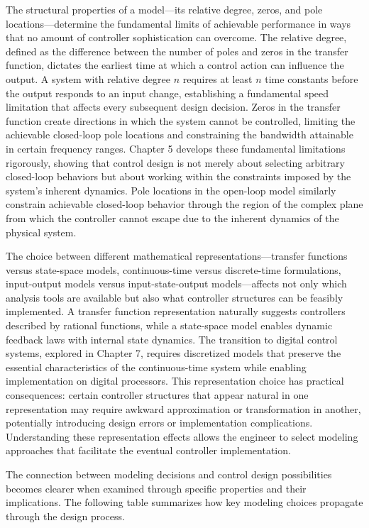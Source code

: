The structural properties of a model—its relative degree, zeros, and pole locations—determine the fundamental limits of achievable performance in ways that no amount of controller sophistication can overcome. The relative degree, defined as the difference between the number of poles and zeros in the transfer function, dictates the earliest time at which a control action can influence the output. A system with relative degree $n$ requires at least $n$ time constants before the output responds to an input change, establishing a fundamental speed limitation that affects every subsequent design decision. Zeros in the transfer function create directions in which the system cannot be controlled, limiting the achievable closed-loop pole locations and constraining the bandwidth attainable in certain frequency ranges. Chapter 5 develops these fundamental limitations rigorously, showing that control design is not merely about selecting arbitrary closed-loop behaviors but about working within the constraints imposed by the system's inherent dynamics. Pole locations in the open-loop model similarly constrain achievable closed-loop behavior through the region of the complex plane from which the controller cannot escape due to the inherent dynamics of the physical system.

The choice between different mathematical representations—transfer functions versus state-space models, continuous-time versus discrete-time formulations, input-output models versus input-state-output models—affects not only which analysis tools are available but also what controller structures can be feasibly implemented. A transfer function representation naturally suggests controllers described by rational functions, while a state-space model enables dynamic feedback laws with internal state dynamics. The transition to digital control systems, explored in Chapter 7, requires discretized models that preserve the essential characteristics of the continuous-time system while enabling implementation on digital processors. This representation choice has practical consequences: certain controller structures that appear natural in one representation may require awkward approximation or transformation in another, potentially introducing design errors or implementation complications. Understanding these representation effects allows the engineer to select modeling approaches that facilitate the eventual controller implementation.

The connection between modeling decisions and control design possibilities becomes clearer when examined through specific properties and their implications. The following table summarizes how key modeling choices propagate through the design process.

